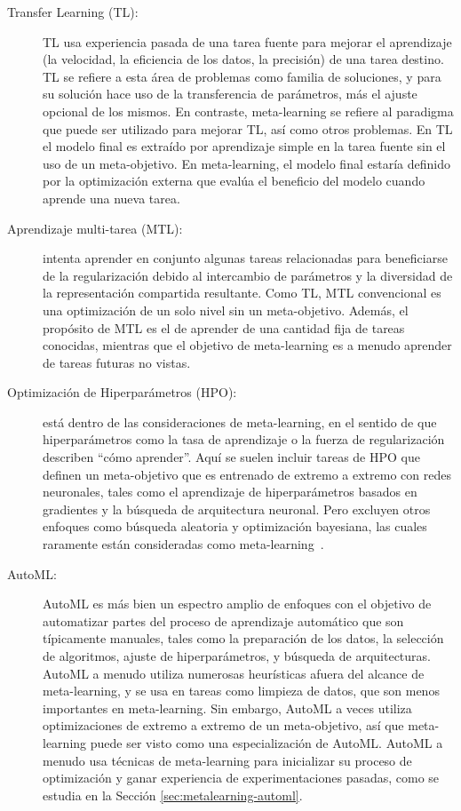 \begin{description}
	\item[Transfer Learning (TL):] TL usa experiencia pasada de una tarea fuente para mejorar el aprendizaje (la velocidad, la eficiencia de los datos, la precisión) de una tarea destino. TL se refiere a esta área de problemas como familia de soluciones, y para su solución hace uso de la transferencia de parámetros, más el ajuste opcional de los mismos. En contraste, meta-learning se refiere al paradigma que puede ser utilizado para mejorar TL, así como otros problemas. En TL el modelo final es extraído por aprendizaje simple en la tarea fuente sin el uso de un meta-objetivo. En meta-learning, el modelo final estaría definido por la optimización externa que evalúa el beneficio del modelo cuando aprende una nueva tarea. %
	
	\item[Aprendizaje multi-tarea (MTL):] intenta aprender en conjunto algunas tareas relacionadas para beneficiarse de la regularización debido al intercambio de parámetros y la diversidad de la representación compartida resultante. Como TL, MTL convencional es una optimización de un solo nivel sin un meta-objetivo. Además, el propósito de MTL es el de aprender de una cantidad fija de tareas conocidas, mientras que el objetivo de meta-learning es a menudo aprender de tareas futuras no vistas.
	 
	\item[Optimización de Hiperparámetros (HPO):] está dentro de las consideraciones de meta-learning, en el sentido de que hiperparámetros como la tasa de aprendizaje o la fuerza de regularización describen ``cómo aprender''. Aquí se suelen incluir tareas de HPO que definen un meta-objetivo que es entrenado de extremo a extremo con redes neuronales, tales como el aprendizaje de hiperparámetros basados en gradientes y la búsqueda de arquitectura neuronal. Pero excluyen otros enfoques como búsqueda aleatoria y optimización bayesiana, las cuales raramente están consideradas como meta-learning~\cite{hospedales2021metalearning}.
	
	\item[AutoML:] AutoML es más bien un espectro amplio de enfoques con el objetivo de automatizar partes del proceso de aprendizaje automático que son típicamente manuales, tales como la preparación de los datos, la selección de algoritmos, ajuste de hiperparámetros, y búsqueda de arquitecturas. AutoML a menudo utiliza numerosas heurísticas afuera del alcance de meta-learning, y se usa en tareas como limpieza de datos, que son menos importantes en meta-learning. Sin embargo, AutoML a veces utiliza optimizaciones de extremo a extremo de un meta-objetivo, así que meta-learning puede ser visto como una especialización de AutoML. AutoML a menudo usa técnicas de meta-learning para inicializar su proceso de optimización y ganar experiencia de experimentaciones pasadas, como se estudia en la Sección \ref{sec:metalearning-automl}.
\end{description}

